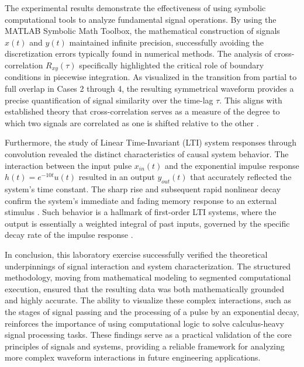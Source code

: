 The experimental results demonstrate the effectiveness of using symbolic computational tools to analyze fundamental signal operations. By using the MATLAB Symbolic Math Toolbox, the mathematical construction of signals $x(t)$ and $y(t)$ maintained infinite precision, successfully avoiding the discretization errors typically found in numerical methods. The analysis of cross-correlation $R_{xy}(\tau)$ specifically highlighted the critical role of boundary conditions in piecewise integration. As visualized in the transition from partial to full overlap in Cases 2 through 4, the resulting symmetrical waveform provides a precise quantification of signal similarity over the time-lag $\tau$. This aligns with established theory that cross-correlation serves as a measure of the degree to which two signals are correlated as one is shifted relative to the other \cite{oppenheim1997}.

Furthermore, the study of Linear Time-Invariant (LTI) system responses through convolution revealed the distinct characteristics of causal system behavior. The interaction between the input pulse $x_{in}(t)$ and the exponential impulse response $h(t) = e^{-10t}u(t)$ resulted in an output $y_{out}(t)$ that accurately reflected the system's time constant. The sharp rise and subsequent rapid nonlinear decay confirm the system's immediate and fading memory response to an external stimulus \cite{haykin1999}. Such behavior is a hallmark of first-order LTI systems, where the output is essentially a weighted integral of past inputs, governed by the specific decay rate of the impulse response \cite{proakis2007}.

In conclusion, this laboratory exercise successfully verified the theoretical underpinnings of signal interaction and system characterization. The structured methodology, moving from mathematical modeling to segmented computational execution, ensured that the resulting data was both mathematically grounded and highly accurate. The ability to visualize these complex interactions, such as the stages of signal passing and the processing of a pulse by an exponential decay, reinforces the importance of using computational logic to solve calculus-heavy signal processing tasks. These findings serve as a practical validation of the core principles of signals and systems, providing a reliable framework for analyzing more complex waveform interactions in future engineering applications.